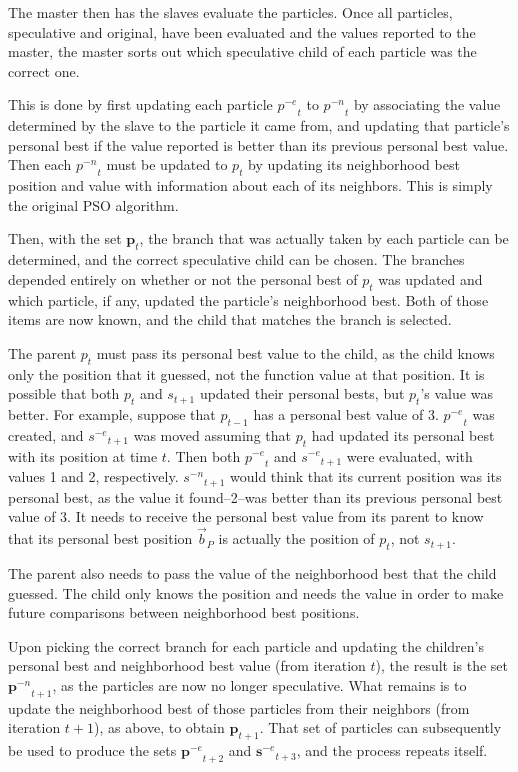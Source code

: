 \documentclass[conference,letterpaper]{IEEEtran}
\providecommand{\pbest}{\ensuremath{\Vec{b}_P}}
\providecommand{\noeval}[1]{\ensuremath{#1^{-e}}}
\providecommand{\nonbest}[1]{\ensuremath{#1^{-n}}}
\providecommand{\p}{\ensuremath{p}}
\providecommand{\pset}{\ensuremath{\mathbf{p}}}
\providecommand{\s}{\ensuremath{s}}
\providecommand{\sset}{\ensuremath{\mathbf{s}}}
\begin{document}
The master then has the slaves evaluate the particles.  Once all particles,
speculative and original, have been evaluated and the values reported to the
master, the master sorts out which speculative child of each particle was the
correct one.

This is done by first updating each particle $\noeval{\p}_t$ to
$\nonbest{\p}_t$ by associating the value determined by the slave to the
particle it came from, and updating that particle's personal best if the value
reported is better than its previous personal best value.  Then each
$\nonbest{\p}_t$ must be updated to $\p_t$ by updating its neighborhood best
position and value with information about each of its neighbors.  This is
simply the original PSO algorithm.

Then, with the set $\pset_t$, the branch that was actually taken by each
particle can be determined, and the correct speculative child can be chosen.
The branches depended entirely on whether or not the personal best of $p_t$ was
updated and which particle, if any, updated the particle's neighborhood best.
Both of those items are now known, and the child that matches the branch is
selected.

The parent $\p_t$ must pass its personal best value to the child, as the child
knows only the position that it guessed, not the function value at that
position.  It is possible that both $\p_t$ and $\s_{t+1}$ updated their
personal bests, but $\p_t$'s value was better.  For example, suppose that
$\p_{t-1}$ has a personal best value of 3.  $\noeval{\p}_t$ was created, and
$\noeval{\s}_{t+1}$ was moved assuming that $\p_t$ had updated its personal
best with its position at time $t$.  Then both $\noeval{\p}_t$ and
$\noeval{\s}_{t+1}$ were evaluated, with values 1 and 2, respectively.
$\nonbest{\s}_{t+1}$ would think that its current position was its personal
best, as the value it found--2--was better than its previous personal best
value of 3.  It needs to receive the personal best value from its parent to
know that its personal best position $\pbest$ is actually the position of
$\p_t$, not $\s_{t+1}$.

The parent also needs to pass the value of the neighborhood best that the child
guessed.  The child only knows the position and needs the value in order to
make future comparisons between neighborhood best positions.

Upon picking the correct branch for each particle and updating the children's
personal best and neighborhood best value (from iteration $t$), the result is
the set $\nonbest{\pset}_{t+1}$, as the particles are now no longer
speculative.  What remains is to update the neighborhood best of those
particles from their neighbors (from iteration $t+1$), as above, to obtain
$\pset_{t+1}$.  That set of particles can subsequently be used to produce the
sets $\noeval{\pset}_{t+2}$ and $\noeval{\sset}_{t+3}$, and the process repeats
itself.
\end{document}
